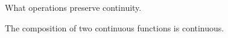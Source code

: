 \sbasic


\sstart



What operations preserve continuity.


\begin{prop}
The composition of two continuous
functions is continuous.
\end{prop}

\strats
